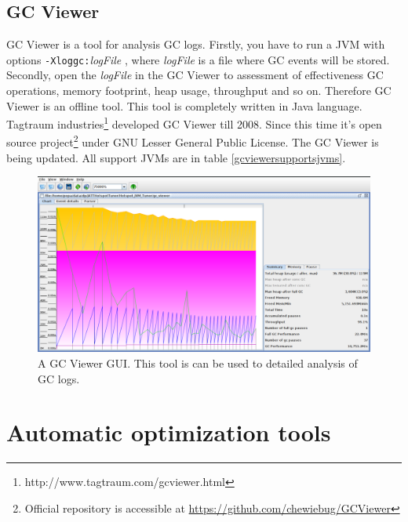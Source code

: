 \documentclass[
  digital, %
  oneside,
  notable, %
  nolof,     %
  nolot     %
]{fithesis3}
\begin{document}
\subsection{GC Viewer}
GC Viewer is a tool for analysis GC logs. Firstly, you have to run a JVM with options \texttt{-Xloggc:}\textit{logFile} \texttt{}, where \textit{logFile} is a file where GC events will be stored. Secondly, open the \textit{logFile} in the GC Viewer to assessment of effectiveness GC operations, memory footprint, heap usage, throughput and so on. Therefore GC Viewer is an offline tool.
This tool is completely written in Java language. Tagtraum industries\footnote{http://www.tagtraum.com/gcviewer.html} developed GC Viewer till 2008. Since this time it's open source project\footnote{Official repository is accessible at \url{https://github.com/chewiebug/GCViewer}} under GNU Lesser General Public License.\cite{gcviewer} The GC Viewer is being updated. All support JVMs are in table \ref{gcviewersupportsjvms}.

\begin{figure}[h]
	\centering
	\includegraphics[width=13cm]{fig/gcviewer.png}
	\caption{A GC Viewer GUI. This tool is can be used to detailed analysis of GC logs.}
	\label{gcviwer}
\end{figure}






\section{Automatic optimization tools}\label{autoopt}

\end{document}
